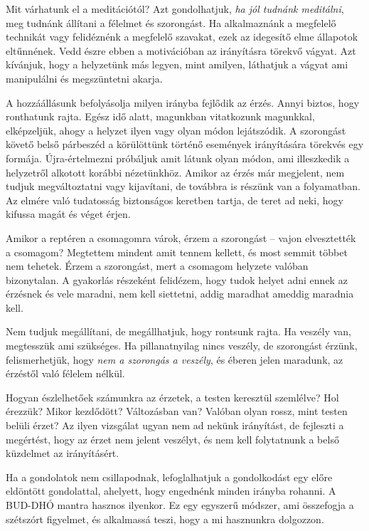 Mit várhatunk el a meditációtól? Azt gondolhatjuk, \emph{ha jól tudnánk
meditálni}, meg tudnánk állítani a félelmet és szorongást. Ha
alkalmaznánk a megfelelő technikát vagy felidéznénk a megfelelő
szavakat, ezek az idegesítő elme állapotok eltűnnének. Vedd észre ebben
a motivációban az irányításra törekvő vágyat. Azt kívánjuk, hogy a
helyzetünk más legyen, mint amilyen, láthatjuk a vágyat ami manipulálni
és megszüntetni akarja.

A hozzáállásunk befolyásolja milyen irányba fejlődik az érzés. Annyi
biztos, hogy ronthatunk rajta. Egész idő alatt, magunkban vitatkozunk
magunkkal, elképzeljük, ahogy a helyzet ilyen vagy olyan módon
lejátszódik. A szorongást követő belső párbeszéd a körülöttünk történő
események irányítására törekvés egy formája. Újra-értelmezni próbáljuk
amit látunk olyan módon, ami illeszkedik a helyzetről alkotott korábbi
nézetünkhöz. Amikor az érzés már megjelent, nem tudjuk megváltoztatni
vagy kijavítani, de továbbra is részünk van a folyamatban. Az elmére
való tudatosság biztonságos keretben tartja, de teret ad neki, hogy
kifussa magát és véget érjen.

Amikor a reptéren a csomagomra várok, érzem a szorongást -- vajon
elvesztették a csomagom? Megtettem mindent amit tennem kellett, és most
semmit többet nem tehetek. Érzem a szorongást, mert a csomagom helyzete
valóban bizonytalan. A gyakorlás részeként felidézem, hogy tudok helyet
adni ennek az érzésnek és vele maradni, nem kell siettetni, addig
maradhat ameddig maradnia kell.

Nem tudjuk megállítani, de megállhatjuk, hogy rontsunk rajta. Ha veszély
van, megtesszük ami szükséges. Ha pillanatnyilag nincs veszély, de
szorongást érzünk, felismerhetjük, hogy \emph{nem a szorongás a
veszély}, és éberen jelen maradunk, az érzéstől való félelem nélkül.


Hogyan észlelhetőek számunkra az érzetek, a testen keresztül szemlélve?
Hol érezzük? Mikor kezdődött? Változásban van? Valóban olyan rossz, mint
testen belüli érzet? Az ilyen vizsgálat ugyan nem ad nekünk irányítást,
de fejleszti a megértést, hogy az érzet nem jelent veszélyt, és nem kell
folytatnunk a belső küzdelmet az irányításért.

Ha a gondolatok nem csillapodnak, lefoglalhatjuk a gondolkodást egy
előre eldöntött gondolattal, ahelyett, hogy engednénk minden irányba
rohanni. A BUD-DHÓ mantra hasznos ilyenkor. Ez egy egyszerű módszer, ami
összefogja a szétszórt figyelmet, és alkalmassá teszi, hogy a mi
hasznunkra dolgozzon.

